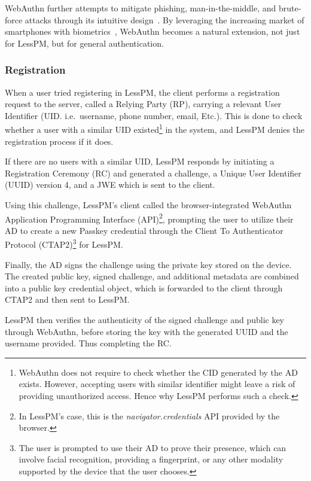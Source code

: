 WebAuthn further attempts to mitigate phishing, man-in-the-middle, and
brute-force attacks through its intuitive design~\cite{webauthn_level_2}.
By leveraging the increasing market of smartphones with
biometrics~\cite{statista-biometric-transactions}, WebAuthn becomes a natural
extension, not just for LessPM, but for general authentication.

\subsubsection{Registration}\label{subsubsec:metho-registration}
When a user tried registering in LessPM, the client performs a
registration request to the server, called a Relying Party (RP), carrying a
relevant User Identifier (UID. i.e.\ username, phone number, email, Etc.).
This is done to check whether a user with a similar UID existed\footnote{
  WebAuthn does not require to check whether the CID generated by the AD exists.
  However, accepting users with similar identifier might leave a risk of
  providing unauthorized access.
  Hence why LessPM performs such a check.
} in the system, and LessPM denies the registration process if it does.

If there are no users with a similar UID, LessPM responds by initiating a
Registration Ceremony (RC) and generated a challenge, a Unique User
Identifier (UUID) version 4, and a JWE which is sent to the client.

Using this challenge, LessPM's client called the browser-integrated WebAuthn
Application Programming Interface (API)\footnote{
  In LessPM's case, this is the \textit{navigator.credentials} API provided by
  the browser.
}, prompting the
user to utilize their AD to create a new Passkey credential
through the Client To Authenticator Protocol (CTAP2)\footnote{
  The user is prompted to use their AD to prove their presence, which can
  involve facial recognition, providing a fingerprint, or any other modality
  supported by the device that the user chooses.
} for
LessPM\@.

Finally, the AD signs the challenge using the private key stored on the
device.
The created public key, signed challenge, and additional metadata are combined
into a public key credential object, which is forwarded to the client
through CTAP2 and then sent to LessPM\@.

LessPM then verifies the authenticity of the signed challenge and public key
through WebAuthn, before storing the key with the generated UUID and the
username provided.
Thus completing the RC\@.

